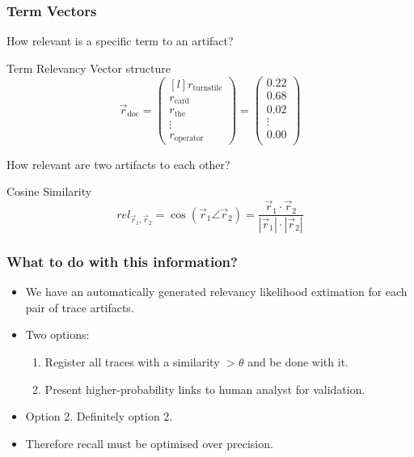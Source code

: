 \documentclass{beamer}
\begin{document}
\begin{frame}
\frametitle{Term Vectors}
How relevant is a specific term to an artifact?

\begin{block}{Term Relevancy Vector structure}
\[
\vec{r}_\text{doc}=
\begin{pmatrix*}[l]
  r_\text{turnstile}\\
  r_\text{card}\\
  r_\text{the}\\
  \vdots\\
  r_\text{operator}
\end{pmatrix*}
=
\begin{pmatrix}
  0.22\\
  0.68\\
  0.02\\
  \vdots\\
  0.00\\
\end{pmatrix}
\]
\end{block}

\vfill
How relevant are two artifacts to each other?

\begin{block}{Cosine Similarity}
  \[ rel_{\vec r_1, \vec r_2} = \cos(\vec r_1 \angle \vec r_2)
  = \frac{\vec r_1 \cdot \vec r_2}{|\vec r_1| \cdot |\vec r_2| } \]
\end{block}

\end{frame}

\begin{frame}
\frametitle{What to do with this information?}
\begin{itemize}
\item We have an automatically generated relevancy likelihood extimation for each pair of trace artifacts.
\item Two options:
  \begin{enumerate}
  \item Register all traces with a similarity $>\theta$ and be done with it.
  \item Present higher-probability links to human analyst for validation.
  \end{enumerate}
\item Option 2. Definitely option 2.
\item Therefore recall must be optimised over precision.
\end{itemize}
\end{frame}
\end{document}
